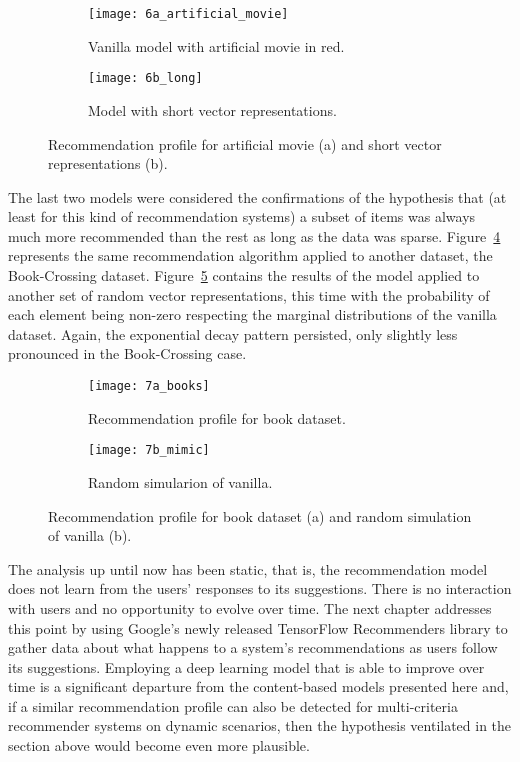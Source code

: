 \begin{figure}
  \centering
  \begin{subfigure}{0.45\textwidth}
    \centering
    \texttt{[image: 6a\_artificial\_movie]}
    \caption{Vanilla model with artificial movie in red.\label{fig:fig6a}}
  \end{subfigure}
  \begin{subfigure}{0.45\textwidth}
    \centering
    \texttt{[image: 6b\_long]}
    \caption{Model with short vector representations.\label{fig:fig6b}}
  \end{subfigure}
  \caption{Recommendation profile for artificial movie (a) and short vector
    representations (b).\label{fig:fig6}}
\end{figure}

The last two models were considered the confirmations of the hypothesis that (at
least for this kind of recommendation systems) a subset of items was always much
more recommended than the rest as long as the data was sparse.
Figure~\ref{fig:fig7a} represents the same recommendation algorithm applied to
another dataset, the Book-Crossing dataset. Figure~\ref{fig:fig7b} contains the
results of the model applied to another set of random vector representations,
this time with the probability of each element being non-zero respecting the
marginal distributions of the vanilla dataset. Again, the exponential decay
pattern persisted, only slightly less pronounced in the Book-Crossing case.

\begin{figure}
  \centering
  \begin{subfigure}{0.45\textwidth}
    \centering
    \texttt{[image: 7a\_books]}
    \caption{Recommendation profile for book dataset.\label{fig:fig7a}}
  \end{subfigure}
  \begin{subfigure}{0.45\textwidth}
    \centering
    \texttt{[image: 7b\_mimic]}
    \caption{Random simularion of vanilla.\label{fig:fig7b}}
  \end{subfigure}
  \caption{Recommendation profile for book dataset (a) and random simulation of
    vanilla (b).\label{fig:fig7}}
\end{figure}

The analysis up until now has been static, that is, the recommendation model
does not learn from the users' responses to its suggestions. There is no
interaction with users and no opportunity to evolve over time. The next chapter
addresses this point by using Google's newly released TensorFlow Recommenders
library \citep{noauthor_tensorflow_nodate} to gather data about what happens to
a system's recommendations as users follow its suggestions. Employing a deep
learning model that is able to improve over time is a significant departure from
the content-based models presented here and, if a similar recommendation profile
can also be detected for multi-criteria recommender systems on dynamic
scenarios, then the hypothesis ventilated in the section above would become even
more plausible.
